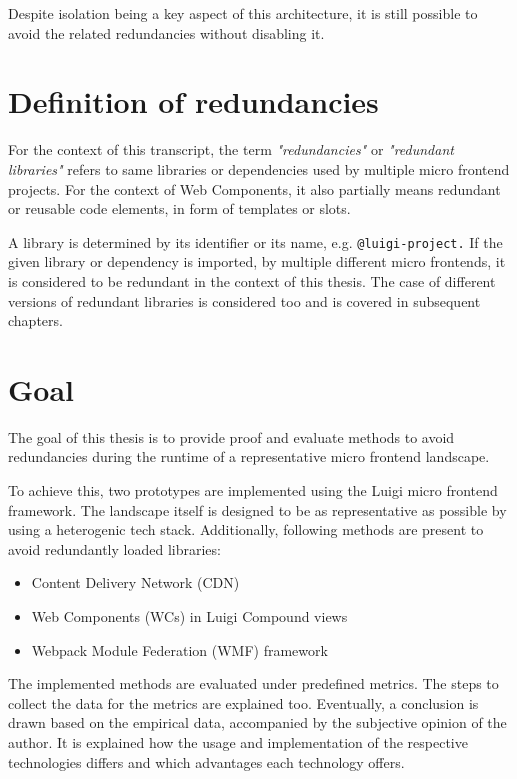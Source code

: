 Despite isolation being a key aspect of this architecture, it is still possible to avoid the related redundancies without disabling it.

\section{Definition of redundancies}

For the context of this transcript, the term \textit{"redundancies"} or \textit{"redundant libraries"} refers to same libraries or dependencies used by multiple micro frontend projects. For the context of Web Components, it also partially means redundant or reusable code elements, in form of templates or slots.

A library is determined by its identifier or its name, e.g. \texttt{@luigi-project.} If the given library or dependency is imported, by multiple different micro frontends, it is considered to be redundant in the context of this thesis. The case of different versions of redundant libraries is considered too and is covered in subsequent chapters.

\section{Goal}

The goal of this thesis is to provide proof and evaluate methods to avoid redundancies during the runtime of a representative micro frontend landscape. 

To achieve this, two prototypes are implemented using the Luigi micro frontend framework. The landscape itself is designed to be as representative as possible by using a heterogenic tech stack. Additionally, following methods are present to avoid redundantly loaded libraries:

\begin{itemize}[noitemsep]
	\item Content Delivery Network (CDN)
	\item Web Components (WCs) in Luigi Compound views
	\item Webpack Module Federation (WMF) framework
\end{itemize}

The implemented methods are evaluated under predefined metrics. The steps to collect the data for the metrics are explained too.
Eventually, a conclusion is drawn based on the empirical data, accompanied by the subjective opinion of the author. It is explained how the usage and implementation of the respective technologies differs and which advantages each technology offers.
  
